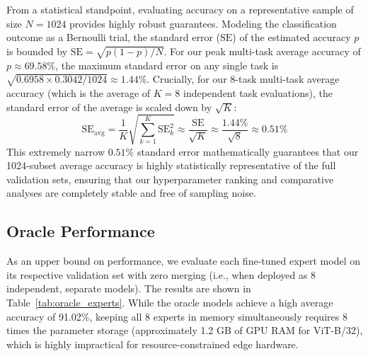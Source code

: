 From a statistical standpoint, evaluating accuracy on a representative sample of size $N=1024$ provides highly robust guarantees. Modeling the classification outcome as a Bernoulli trial, the standard error ($\text{SE}$) of the estimated accuracy $p$ is bounded by $\text{SE} = \sqrt{p(1-p)/N}$. For our peak multi-task average accuracy of $p \approx 69.58\%$, the maximum standard error on any single task is $\sqrt{0.6958 \times 0.3042 / 1024} \approx 1.44\%$. Crucially, for our 8-task multi-task average accuracy (which is the average of $K=8$ independent task evaluations), the standard error of the average is scaled down by $\sqrt{K}$:
\begin{equation}
\text{SE}_{\text{avg}} = \frac{1}{K} \sqrt{\sum_{k=1}^K \text{SE}_k^2} \approx \frac{\text{SE}}{\sqrt{K}} \approx \frac{1.44\%}{\sqrt{8}} \approx 0.51\%
\end{equation}
This extremely narrow $0.51\%$ standard error mathematically guarantees that our 1024-subset average accuracy is highly statistically representative of the full validation sets, ensuring that our hyperparameter ranking and comparative analyses are completely stable and free of sampling noise.

\subsection{Oracle Performance}
As an upper bound on performance, we evaluate each fine-tuned expert model on its respective validation set with zero merging (i.e., when deployed as 8 independent, separate models). The results are shown in Table~\ref{tab:oracle_experts}. While the oracle models achieve a high average accuracy of 91.02\%, keeping all 8 experts in memory simultaneously requires 8 times the parameter storage (approximately 1.2 GB of GPU RAM for ViT-B/32), which is highly impractical for resource-constrained edge hardware.

